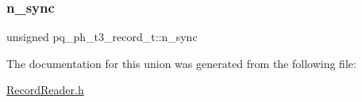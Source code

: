 \subsubsection{\texorpdfstring{n\+\_\+sync}{n\_sync}}
{\footnotesize\ttfamily unsigned pq\+\_\+ph\+\_\+t3\+\_\+record\+\_\+t\+::n\+\_\+sync}



The documentation for this union was generated from the following file\+:\begin{DoxyCompactItemize}
\item 
\hyperlink{_record_reader_8h}{Record\+Reader.\+h}\end{DoxyCompactItemize}
